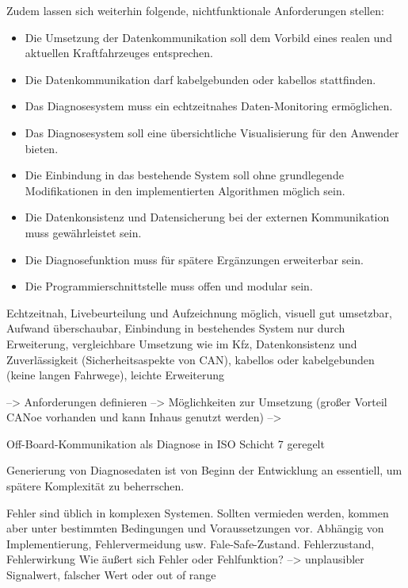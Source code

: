 Zudem lassen sich weiterhin folgende, nichtfunktionale Anforderungen stellen:
\begin{itemize}
	\item Die Umsetzung der Datenkommunikation soll dem Vorbild eines realen und aktuellen Kraftfahrzeuges entsprechen.
	\item Die Datenkommunikation darf kabelgebunden oder kabellos stattfinden.
	\item Das Diagnosesystem muss ein echtzeitnahes Daten-Monitoring ermöglichen.
	\item Das Diagnosesystem soll eine übersichtliche Visualisierung für den Anwender bieten. 
	\item Die Einbindung in das bestehende System soll ohne grundlegende Modifikationen in den implementierten Algorithmen möglich sein.
	\item Die Datenkonsistenz und Datensicherung bei der externen Kommunikation muss gewährleistet sein.
	\item Die Diagnosefunktion muss für spätere Ergänzungen erweiterbar sein.
	\item Die Programmierschnittstelle muss offen und modular sein. 
\end{itemize}


\newpage


Echtzeitnah, Livebeurteilung und Aufzeichnung möglich, visuell gut umsetzbar, Aufwand überschaubar, Einbindung in bestehendes System nur durch Erweiterung, vergleichbare Umsetzung wie im Kfz, Datenkonsistenz und Zuverlässigkeit (Sicherheitsaspekte von CAN), kabellos oder kabelgebunden (keine langen Fahrwege), leichte Erweiterung 



--> Anforderungen definieren
--> Möglichkeiten zur Umsetzung (großer Vorteil CANoe vorhanden und kann Inhaus genutzt werden)
--> 

Off-Board-Kommunikation als Diagnose in ISO Schicht 7 geregelt 
 
Generierung von Diagnosedaten ist von Beginn der Entwicklung an essentiell, um spätere Komplexität zu beherrschen. 





Fehler sind üblich in komplexen Systemen. Sollten vermieden werden, kommen aber unter bestimmten Bedingungen und Voraussetzungen vor. Abhängig von Implementierung, Fehlervermeidung usw. Fale-Safe-Zustand. Fehlerzustand, Fehlerwirkung
Wie äußert sich Fehler oder Fehlfunktion? --> unplausibler Signalwert, falscher Wert oder out of range

